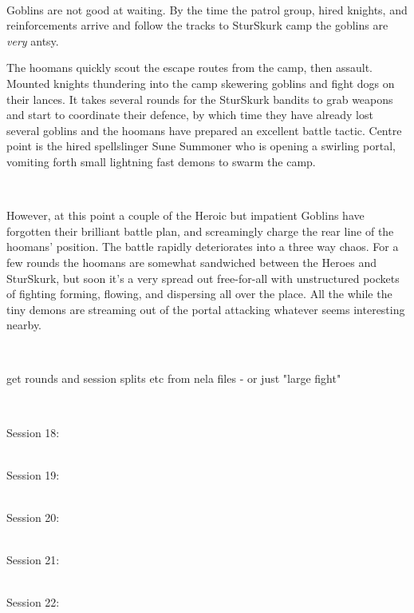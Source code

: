 \

Goblins are not good at waiting. By the time the patrol group, hired knights, and reinforcements arrive and follow the tracks to SturSkurk camp the goblins are \emph{very} antsy.

The hoomans quickly scout the escape routes from the camp, then assault. Mounted knights thundering into the camp skewering goblins and fight dogs on their lances. It takes several rounds for the SturSkurk bandits to grab weapons and start to coordinate their defence, by which time they have already lost several goblins and the hoomans have prepared an excellent battle tactic. Centre point is the hired spellslinger Sune Summoner who is opening a swirling portal, vomiting forth small lightning fast demons to swarm the camp.

\

However, at this point a couple of the Heroic but impatient Goblins have forgotten their brilliant battle plan, and screamingly charge the rear line of the hoomans' position. The battle rapidly deteriorates into a three way chaos. For a few rounds the hoomans are somewhat sandwiched between the Heroes and SturSkurk, but soon it's a very spread out free-for-all with unstructured pockets of fighting forming, flowing, and dispersing all over the place. All the while the tiny demons are streaming out of the portal attacking whatever seems interesting nearby. 

\

\todo get rounds and session splits etc from nela files  -  or just "large fight"

\

Session 18:\\                                                           %

\

Session 19:\\                                                           %

\

Session 20:\\                                                           %

\

Session 21:\\                                                           %

\

Session 22:\\                                                           %

